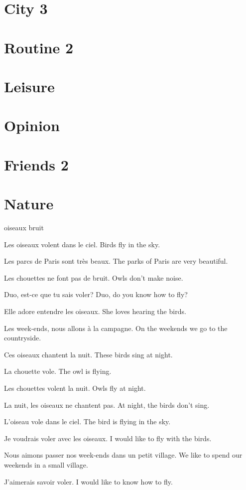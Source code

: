 \documentclass[a4paper,11pt,oneside]{book}
\begin{document}
\section{City 3}
\section{Routine 2}
\section{Leisure}
\section{Opinion}
\section{Friends 2}
\section{Nature}

oiseaux
bruit

Les oiseaux volent dans le ciel.
Birds fly in the sky.

Les parcs de Paris sont très beaux.
The parks of Paris are very beautiful.

Les chouettes ne font pas de bruit.
Owls don't make noise.

Duo, est-ce que tu sais voler?
Duo, do you know how to fly?

Elle adore entendre les oiseaux.
She loves hearing the birds.

Les week-ends, nous allons à la campagne.
On the weekends we go to the countryside.

Ces oiseaux chantent la nuit.
These birds sing at night.

La chouette vole.
The owl is flying.

Les chouettes volent la nuit.
Owls fly at night.

La nuit, les oiseaux ne chantent pas.
At night, the birds don't sing.

L'oiseau vole dans le ciel.
The bird is flying in the sky.

Je voudrais voler avec les oiseaux.
I would like to fly with the birds.

Nous aimons passer nos week-ends dans un petit village.
We like to spend our weekends in a small village.

J'aimerais savoir voler.
I would like to know how to fly.
\end{document}
